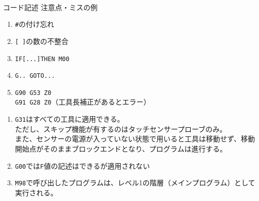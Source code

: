 \begin{appendices}
\clearpage
~\vfill
\begin{Column}{コード記述 注意点・ミスの例}
\begin{enumerate}
\item \verb|#|の付け忘れ
\item \verb|[ ]|の数の不整合
\item \verb|IF[...]THEN M00|
\item \verb|G.. GOTO...|
\item \verb|G90 G53 Z0|\\
      \verb|G91 G28 Z0|（工具長補正があるとエラー）
\end{enumerate}
\tcbline*
\begin{enumerate}
\item
\verb|G31|はすべての工具に適用できる。\\
ただし、スキップ機能が有するのはタッチセンサープローブのみ。\\
また、センサーの電源が入っていない状態で用いると工具は移動せず、移動開始点がそのままブロックエンドとなり、プログラムは進行する。
\item \verb|G00|では\verb|F|値の記述はできるが適用されない
\item \verb|M98|で呼び出したプログラムは、レベル1の階層（メインプログラム）として実行される。
\end{enumerate}
\end{Column}


\end{appendices}
